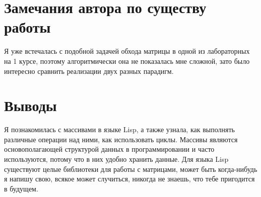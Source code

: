 \documentclass[12pt]{article}
\begin{document}
\section{Замечания автора по существу работы}
Я уже встечалась с подобной задачей обхода матрицы в одной из лабораторных на 1 курсе, поэтому алгоритмически она не показалась мне сложной, зато было интересно сравнить реализации двух разных парадигм. 

\section{Выводы}
Я познакомилась с массивами в языке Lisp, а также узнала, как выполнять различные операции над ними, как использовать циклы. Массивы являются основополагающей структурой данных в программировании и часто используются, потому что в них удобно хранить данные. Для языка Lisp существуют целые библиотеки для работы с матрицами, может быть когда-нибудь я напишу свою, всякое может случиться, никогда не знаешь, что тебе пригодится в будущем.
\end{document}
